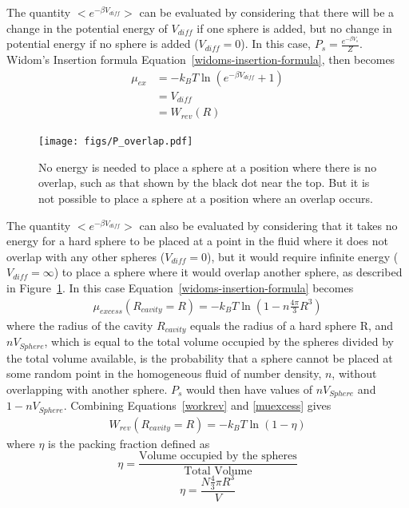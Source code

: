 \documentclass[double,12pt]{beavtex}
\begin{document}
The quantity $<e^{-\beta{V_{diff}}}>$ can be evaluated by considering that
there will be a change in the potential energy of $V_{diff}$ if one sphere
is added, but no change in potential energy if no sphere is added ($V_{diff}=0$). 
In this case, $P_s=\frac{e^{-\beta V_s}}{Z}$.
Widom's Insertion formula Equation~\ref{widoms-insertion-formula}, 
then becomes~\cite{Hansen}
\begin{align} 
	\mu_{ex} &= -k_BT\ln\left(e^{-\beta{V_{diff}}}+1\right)  \\
	         &= V_{diff} \\
             &= W_{rev}(R)  \label{workrev}
\end{align}
\begin{figure}
    \centering
    \texttt{[image: figs/P\_overlap.pdf]}
    \caption{No energy is needed to place a sphere at a position where 
    there is no overlap, such as that shown by the black dot near the 
    top. But it is not possible to place a sphere at a position where 
    an overlap occurs.}
    \label{fig:p_overlap}
  \end{figure}
The quantity $<e^{-\beta{V_{diff}}}>$ can also be evaluated by considering
that it takes no energy for a hard sphere to be placed at a point
in the fluid where it does not overlap with any other spheres 
($V_{diff}=0$), but it would require infinite energy ($V_{diff}=\infty$)
to place a sphere where it would overlap another sphere, as described 
in Figure~\ref{fig:p_overlap}. 
In this case Equation~\ref{widoms-insertion-formula} becomes~\cite{Hansen}
\begin{align} \label{muexcess}
  \mu_{excess}(R_{cavity}=R)=-k_BT\ln(1-n\frac{4\pi}{3}R^3) 
\end{align}
where the radius of the cavity $R_{cavity}$ equals the radius of a 
hard sphere R, and $nV_{Sphere}$, which is equal to the total volume 
occupied by the spheres divided by the total volume available, 
is the probability that a sphere cannot be placed at some random
point in the homogeneous fluid of number density, $n$, without
overlapping with another sphere. $P_s$ would then have values of
$nV_{Sphere}$ and $1-nV_{Sphere}$.
Combining  Equations~\ref{workrev} 
and \ref{muexcess} gives
\begin{align}
  W_{rev}(R_{cavity}=R)=-k_BT\ln(1-\eta) 
\end{align}
where $\eta$ is the packing fraction defined as
\begin{equation}{\eta = \frac{\mbox{Volume occupied by the spheres}}{\mbox{Total Volume}}}\end{equation}
\begin{equation}{\eta = \frac{N\frac{4}{3}\pi{R^3}}{V}}\end{equation}
\end{document}
